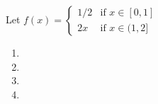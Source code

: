 Let $f(x) = \begin{cases}
    1/2 & \text{if } x \in [0, 1]\\
    2x & \text{if } x \in (1,2]
\end{cases}$

\begin{enumerate}
\item 
\item 
\item 
\item 
\end{enumerate}

